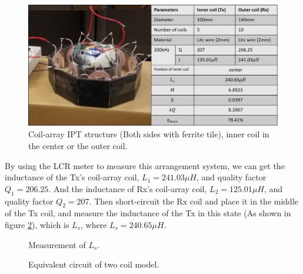 \begin{figure}[!t]
    \centering
    \includegraphics[width=1.0\linewidth]{images/4_coil_5_10_with_ferrite.png}
    \caption{Coil-array IPT structure (Both sides with ferrite tile), inner coil in the center or the outer coil.}
    \label{fig: 10-5 with ferrite}
\end{figure}
By using the LCR meter to measure this arrangement system, we can get the inductance of the Tx's coil-array coil, $L_1 = 241.03 \mu H$, and quality factor $Q_1=206.25$. And the inductance of Rx's coil-array coil, $L_2 = 125.01 \mu H$, and quality factor $Q_2=207$. Then short-circuit the Rx coil and place it in the middle of the Tx coil, and measure the inductance of the Tx in this state (As shown in figure \ref{fig: Ls}), which is $L_s$, where $L_s = 240.65 \mu H$.

\begin{figure}[!b]
    \centering
    \caption{Measurement of $L_s$.}
    \label{fig: Ls}
\end{figure}

\begin{figure}[!t]
    \centering
    \caption{Equivalent circuit of two coil model.}
    \label{fig: Ls eq}
\end{figure}


